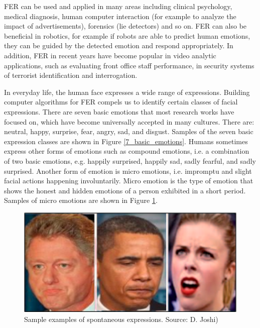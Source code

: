 \documentclass[master]{thesis-uestc}
\begin{document}
FER can be used and applied in many areas including clinical psychology, medical diagnosis, human computer interaction (for example to analyze the impact of advertisements), forensics (lie detectors) and so on\cite{Ivanovsky-2017, sang-2017}. FER can also be beneficial in robotics, for example if robots are able to predict human emotions, they can be guided by the detected emotion and respond appropriately. In addition, FER in recent years have become popular in video analytic applications, such as evaluating front office staff performance, in security systems of terrorist identification and interrogation\cite{sang-2017}.

In everyday life, the human face expresses a wide range of expressions. Building computer algorithms for FER compels us to identify certain classes of facial expressions. There are seven basic emotions that most research works have focused on, which have become universally accepted in many cultures. There are: neutral, happy, surprise, fear, angry, sad, and disgust\cite{Yu:2013:LRF:2459511.2459661}. Samples of the seven basic expression classes are shown in Figure \ref{7_basic_emotions}. Humans sometimes express other forms of emotions such as compound emotions, i.e. a combination of two basic emotions, e.g. happily surprised, happily sad, sadly fearful, and sadly surprised. Another form of emotion is micro emotions, i.e. impromptu and slight facial actions happening involuntarily. Micro emotion is the type of emotion that shows the honest and hidden emotions of a person exhibited in a short period\cite{josh2018}. Samples of micro emotions are shown in Figure \ref{micro_emotions}.

\begin{figure}[ht]
\includegraphics[width=5in]{pic/micro_expressions.png}
\caption{Sample examples of spontaneous expressions. Source: D. Joshi\cite{josh2018})}
\label{micro_emotions}
\end{figure}
\end{document}
